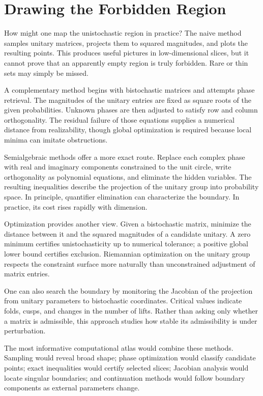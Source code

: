 \documentclass[12pt,openany]{book}
\begin{document}
\chapter{Drawing the Forbidden Region}
How might one map the unistochastic region in practice? The naive method samples unitary matrices, projects them to squared magnitudes, and plots the resulting points. This produces useful pictures in low-dimensional slices, but it cannot prove that an apparently empty region is truly forbidden. Rare or thin sets may simply be missed.

A complementary method begins with bistochastic matrices and attempts phase retrieval. The magnitudes of the unitary entries are fixed as square roots of the given probabilities. Unknown phases are then adjusted to satisfy row and column orthogonality. The residual failure of those equations supplies a numerical distance from realizability, though global optimization is required because local minima can imitate obstructions.

Semialgebraic methods offer a more exact route. Replace each complex phase with real and imaginary components constrained to the unit circle, write orthogonality as polynomial equations, and eliminate the hidden variables. The resulting inequalities describe the projection of the unitary group into probability space. In principle, quantifier elimination can characterize the boundary. In practice, its cost rises rapidly with dimension.

Optimization provides another view. Given a bistochastic matrix, minimize the distance between it and the squared magnitudes of a candidate unitary. A zero minimum certifies unistochasticity up to numerical tolerance; a positive global lower bound certifies exclusion. Riemannian optimization on the unitary group respects the constraint surface more naturally than unconstrained adjustment of matrix entries.

One can also search the boundary by monitoring the Jacobian of the projection from unitary parameters to bistochastic coordinates. Critical values indicate folds, cusps, and changes in the number of lifts. Rather than asking only whether a matrix is admissible, this approach studies how stable its admissibility is under perturbation.

The most informative computational atlas would combine these methods. Sampling would reveal broad shape; phase optimization would classify candidate points; exact inequalities would certify selected slices; Jacobian analysis would locate singular boundaries; and continuation methods would follow boundary components as external parameters change.
\end{document}
